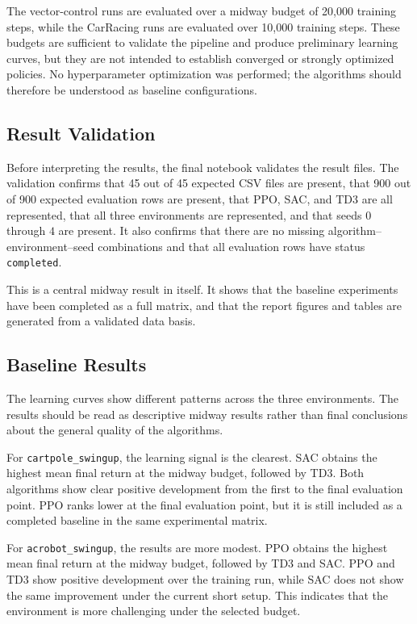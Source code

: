 The vector-control runs are evaluated over a midway budget of 20,000 training steps, while the CarRacing runs are evaluated over 10,000 training steps. These budgets are sufficient to validate the pipeline and produce preliminary learning curves, but they are not intended to establish converged or strongly optimized policies. No hyperparameter optimization was performed; the algorithms should therefore be understood as baseline configurations.

\subsection{Result Validation}
\label{sec:result-validation}

Before interpreting the results, the final notebook validates the result files. The validation confirms that 45 out of 45 expected CSV files are present, that 900 out of 900 expected evaluation rows are present, that PPO, SAC, and TD3 are all represented, that all three environments are represented, and that seeds $0$ through $4$ are present. It also confirms that there are no missing algorithm--environment--seed combinations and that all evaluation rows have status \texttt{completed}.

This is a central midway result in itself. It shows that the baseline experiments have been completed as a full matrix, and that the report figures and tables are generated from a validated data basis.

\subsection{Baseline Results}
\label{sec:baseline-results}

The learning curves show different patterns across the three environments. The results should be read as descriptive midway results rather than final conclusions about the general quality of the algorithms.

For \texttt{cartpole\_swingup}, the learning signal is the clearest. SAC obtains the highest mean final return at the midway budget, followed by TD3. Both algorithms show clear positive development from the first to the final evaluation point. PPO ranks lower at the final evaluation point, but it is still included as a completed baseline in the same experimental matrix.

For \texttt{acrobot\_swingup}, the results are more modest. PPO obtains the highest mean final return at the midway budget, followed by TD3 and SAC. PPO and TD3 show positive development over the training run, while SAC does not show the same improvement under the current short setup. This indicates that the environment is more challenging under the selected budget.

